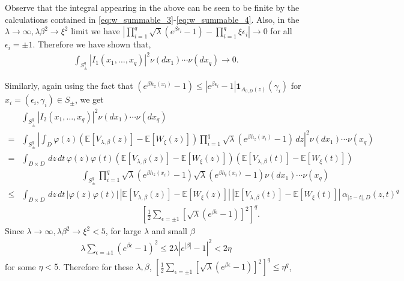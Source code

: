 \documentclass[a4paper, 11pt, reqno]{amsart}
\theoremstyle{definition} \newtheorem{defn}{Definition}[section]
\theoremstyle{remark} \newtheorem{rem}[defn]{Remark}
\theoremstyle{remark} \newtheorem*{rem*}{Remark}
\theoremstyle{plain} \newtheorem{thm}[defn]{Theorem}
\theoremstyle{plain} \newtheorem{lem}[defn]{Lemma}
\theoremstyle{plain} \newtheorem{prop}[defn]{Proposition}
\theoremstyle{plain} \newtheorem{cor}[defn]{Corollary}
\theoremstyle{remark} \newtheorem{exm}[defn]{\textbf{Example}}
\theoremstyle{remark} \newtheorem{exms}[defn]{\textbf{Examples}}
\theoremstyle{remark} \newtheorem*{bl}{}
\numberwithin{equation}{section} %
\newcommand{\x}{\times}
\newcommand{\E}{\mathbb{E}}
\newcommand{\ind}{\mathbf{1}}
\begin{document}
		Observe that the integral appearing in the above can be seen to be finite by the calculations contained in \eqref{eq:w_summable_3}-\eqref{eq:w_summable_4}. Also, in the $\lambda \to\infty, \lambda \beta^2 \to \xi^2$ limit we have $\left|\prod_{i=1}^q\sqrt{\lambda}(e^{\beta \epsilon_i}-1) - \prod_{i=1}^q\xi \epsilon_i \right| \to 0$ for all $\epsilon_i = \pm 1$. Therefore we have shown that,
		\begin{align} \label{eq:f_w_conv_2.5}
			\int_{S_{\pm}^q} |I_1(x_1, \ldots, x_q)|^2 \nu(dx_1)\cdots \nu(dx_q)	\to 0.
		\end{align}
		
		Similarly, again using the fact that $(e^{\beta h_z(x_i)}-1) \le |e^{\beta \epsilon_i}-1| \ind_{A_{0,D}(z)}(\gamma_i)$ for $x_i = (\epsilon_i, \gamma_i) \in S_{\pm}$, we get
		\begin{align} \label{eq:f_w_conv_3}
			& \int_{S_{\pm}^q} |I_2(x_1, \ldots, x_q)|^2 \nu(dx_1)\cdots\nu(dx_q) 
			\nonumber \\
			= & \int_{S_{\pm}^q} \left|\int_D \varphi(z) (\E[V_{\lambda, \beta}(z)] - \E[W_{\xi}(z)]) \prod_{i=1}^q \sqrt{\lambda} (e^{\beta h_z(x_i) }-1) \, dz \right|^2\nu(dx_1) \cdots \nu(x_q)
			\nonumber \\
			= & \int_{D\x D} \, dz \, dt \, \varphi(z) \varphi(t) (\E[V_{\lambda, \beta}(z)] - \E[W_{\xi}(z)]) (\E[V_{\lambda, \beta}(t)] - \E[W_{\xi}(t)]) 
			\nonumber \\
			& \hspace{3cm} \int_{S_{\pm}^q} \prod_{i=1}^q \sqrt{\lambda} (e^{\beta h_z(x_i) }-1) \sqrt{\lambda}(e^{\beta h_t(x_i)}-1)  \nu(dx_1) \cdots \nu(x_q)
			\nonumber \\
			\le & \int_{D\x D} \, dz \, dt \, |\varphi(z) \varphi(t)| \, |\E[V_{\lambda, \beta}(z)] - \E[W_{\xi}(z)]| \, |\E[V_{\lambda, \beta}(t)] - \E[W_{\xi}(t)]| \, \alpha_{|z-t|, D}(z,t)^q 
			\nonumber \\
			& \hspace{6cm} \left[ \frac{1}{2} \sum_{\epsilon = \pm 1} [\sqrt{\lambda}(e^{\beta \epsilon}-1)]^2 \right]^q. 
		\end{align}
		Since $\lambda \to \infty, \lambda\beta^2 \to \xi^2 < 5$, for large $\lambda$ and small $\beta$ 
		\begin{align}
			\lambda \sum_{\epsilon = \pm 1} (e^{\beta \epsilon}-1)^2 \le 2\lambda |e^{|\beta|}-1|^2 < 2 \eta
		\end{align}
		for some $\eta < 5$. Therefore for these $\lambda, \beta$,
		$\left[ \frac{1}{2} \sum_{\epsilon = \pm 1} [\sqrt{\lambda}(e^{\beta \epsilon}-1)]^2 \right]^q \le \eta^q$, 
\end{document}
